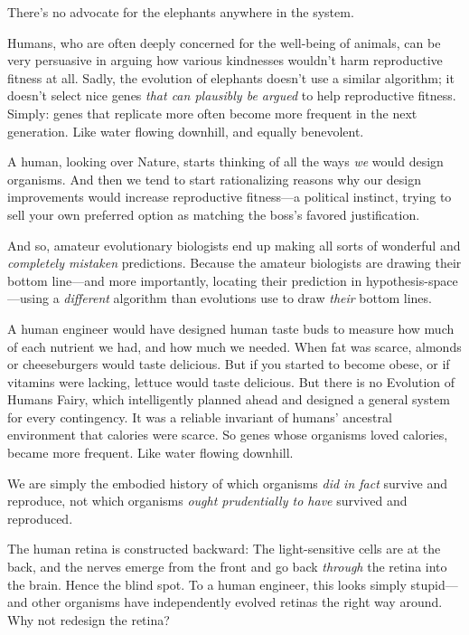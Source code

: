 {
 There's no advocate for the elephants anywhere in
the system.}

{
 Humans, who are often deeply concerned for the well-being of
animals, can be very persuasive in arguing how various kindnesses
wouldn't harm reproductive fitness at all. Sadly, the
evolution of elephants doesn't use a similar algorithm;
it doesn't select nice genes \textit{that can plausibly
be argued} to help reproductive fitness. Simply: genes that replicate
more often become more frequent in the next generation. Like water
flowing downhill, and equally benevolent.}

{
 A human, looking over Nature, starts thinking of all the ways
\textit{we} would design organisms. And then we tend to start
rationalizing reasons why our design improvements would increase
reproductive fitness---a political instinct, trying to sell your own
preferred option as matching the boss's favored
justification.}

{
 And so, amateur evolutionary biologists end up making all sorts of
wonderful and \textit{completely mistaken} predictions. Because the
amateur biologists are drawing their bottom line---and more
importantly, locating their prediction in hypothesis-space---using a
\textit{different} algorithm than evolutions use to draw \textit{their}
bottom lines.}

{
 A human engineer would have designed human taste buds to measure
how much of each nutrient we had, and how much we needed. When fat was
scarce, almonds or cheeseburgers would taste delicious. But if you
started to become obese, or if vitamins were lacking, lettuce would
taste delicious. But there is no Evolution of Humans Fairy, which
intelligently planned ahead and designed a general system for every
contingency. It was a reliable invariant of humans'
ancestral environment that calories were scarce. So genes whose
organisms loved calories, became more frequent. Like water flowing
downhill.}

{
 We are simply the embodied history of which organisms \textit{did
in fact} survive and reproduce, not which organisms \textit{ought
prudentially to have} survived and reproduced.}

{
 The human retina is constructed backward: The light-sensitive
cells are at the back, and the nerves emerge from the front and go back
\textit{through} the retina into the brain. Hence the blind spot. To a
human engineer, this looks simply stupid---and other organisms have
independently evolved retinas the right way around. Why not redesign
the retina?}

